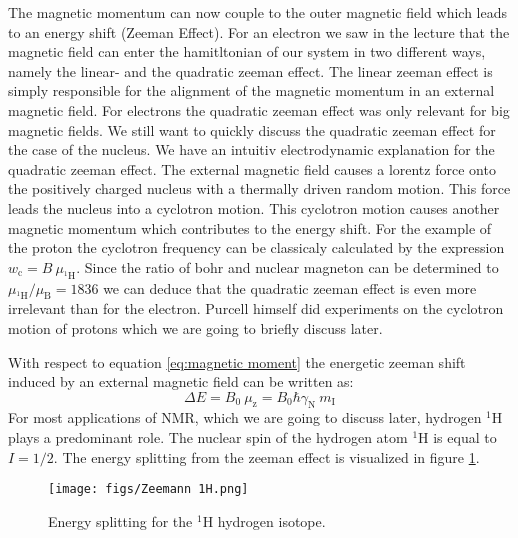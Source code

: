 \documentclass{article}
\begin{document}
The magnetic momentum can now couple to the outer magnetic field which leads to an energy shift (Zeeman Effect). For an electron we saw in the lecture that the magnetic field can enter the hamitltonian of our system in two different ways, namely the linear- and the quadratic zeeman effect. The linear zeeman effect is simply responsible for the alignment of the magnetic momentum in an external magnetic field. For electrons the quadratic zeeman effect was only relevant for big magnetic fields. We still want to quickly discuss the quadratic zeeman effect for the case of the nucleus. We have an intuitiv electrodynamic explanation for the quadratic zeeman effect. The external magnetic field causes a lorentz force onto the positively charged nucleus with a thermally driven random motion. This force leads the nucleus into a cyclotron motion. This cyclotron motion causes another magnetic momentum which contributes to the energy shift. For the example of the proton the cyclotron frequency can be classicaly calculated by the expression $w_{\mathrm{c}}=B\ \mu_{\mathrm{^1 \mathrm{H}}}$. Since the ratio of bohr and nuclear magneton can be determined to $\mu_{\mathrm{^1 \mathrm{H}}}/\mu_{\mathrm{B}}=1836$ we can deduce that the quadratic zeeman effect is even more irrelevant than for the electron. Purcell himself did experiments on the cyclotron motion of protons which we are going to briefly discuss later.\

With respect to equation \ref{eq:magnetic moment} the energetic zeeman shift induced by an external magnetic field can be written as:
\begin{equation}
    \Delta E=B_0 \ \mu_{\mathrm{z}}= B_0 \hbar \gamma_{\mathrm{N}} \ m_{\mathrm{I}}
\end{equation}
For most applications of NMR, which we are going to discuss later, hydrogen $^1 \mathrm{H}$ plays a predominant role. The nuclear spin of the hydrogen atom $^1 \mathrm{H}$ is equal to $I=1/2$. The energy splitting from the zeeman effect is visualized in figure \ref{fig:energy shift}.

\begin{figure}[h]
    \centering
    \texttt{[image: figs/Zeemann 1H.png]}
    \caption{Energy splitting for the $^1 \mathrm{H}$ hydrogen isotope.}
    \label{fig:energy shift}
\end{figure}
\end{document}
